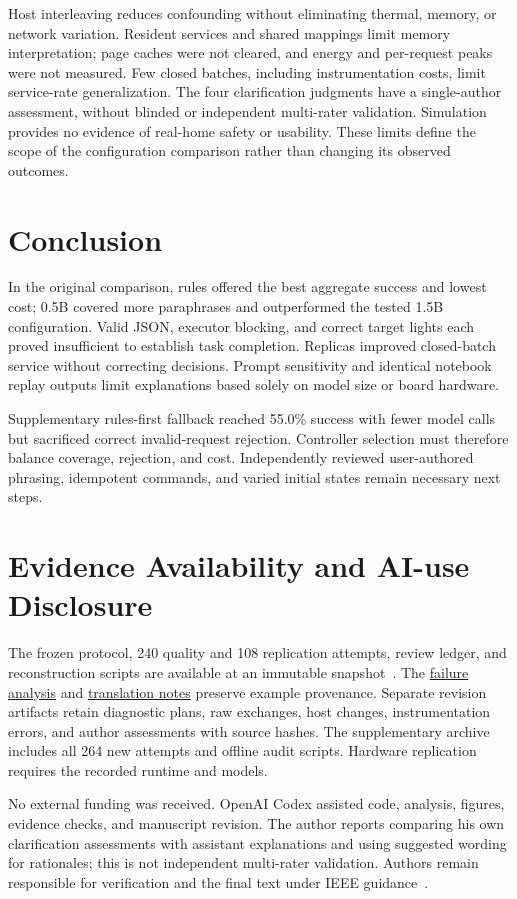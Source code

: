 \documentclass[letterpaper,conference]{IEEEtran}
\providecommand{\StudyPrefix}{}
\begin{document}
Host interleaving reduces confounding without eliminating thermal, memory, or network variation. Resident services and shared mappings limit memory interpretation; page caches were not cleared, and energy and per-request peaks were not measured. Few closed batches, including instrumentation costs, limit service-rate generalization. The four clarification judgments have a single-author assessment, without blinded or independent multi-rater validation. Simulation provides no evidence of real-home safety or usability. These limits define the scope of the configuration comparison rather than changing its observed outcomes.

\section{Conclusion}
In the original comparison, rules offered the best aggregate success and lowest cost; 0.5B covered more paraphrases and outperformed the tested 1.5B configuration. Valid JSON, executor blocking, and correct target lights each proved insufficient to establish task completion. Replicas improved closed-batch service without correcting decisions. Prompt sensitivity and identical notebook replay outputs limit explanations based solely on model size or board hardware.

Supplementary rules-first fallback reached 55.0\% success with fewer model calls but sacrificed correct invalid-request rejection. Controller selection must therefore balance coverage, rejection, and cost. Independently reviewed user-authored phrasing, idempotent commands, and varied initial states remain necessary next steps.

\section*{Evidence Availability and AI-use Disclosure}
The frozen protocol, 240 quality and 108 replication attempts, review ledger, and reconstruction scripts are available at an immutable snapshot~\cite{artifact}. The \href{https://github.com/hudsonmoreira-spec/labrador-distributed-llm-benchmarks/tree/f2f566b179fcf3893099d7d1b12b888455e531ae/experiments/smarthome_agents/analysis/failure-review-20261028}{failure analysis} and \href{https://github.com/hudsonmoreira-spec/labrador-distributed-llm-benchmarks/tree/c0650b876b5e1a9169782d9cc0819c078b13fbe9/paper/smarthome_agents/study_v1/editorial_20261029}{translation notes} preserve example provenance. Separate revision artifacts retain diagnostic plans, raw exchanges, host changes, instrumentation errors, and author assessments with source hashes. The supplementary archive~\cite{hybridartifact} includes all 264 new attempts and offline audit scripts. Hardware replication requires the recorded runtime and models.

No external funding was received. OpenAI Codex assisted code, analysis, figures, evidence checks, and manuscript revision. The author reports comparing his own clarification assessments with assistant explanations and using suggested wording for rationales; this is not independent multi-rater validation. Authors remain responsible for verification and the final text under IEEE guidance~\cite{ieeeai}.


\end{document}

